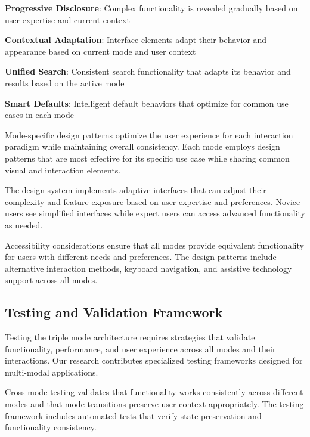 \begin{expandedlist}
    \item \textbf{Progressive Disclosure}: Complex functionality is revealed gradually based on user expertise and current context
    \item \textbf{Contextual Adaptation}: Interface elements adapt their behavior and appearance based on current mode and user context
    \item \textbf{Unified Search}: Consistent search functionality that adapts its behavior and results based on the active mode
    \item \textbf{Smart Defaults}: Intelligent default behaviors that optimize for common use cases in each mode
\end{expandedlist}

Mode-specific design patterns optimize the user experience for each interaction paradigm while maintaining overall consistency. Each mode employs design patterns that are most effective for its specific use case while sharing common visual and interaction elements.

The design system implements adaptive interfaces that can adjust their complexity and feature exposure based on user expertise and preferences. Novice users see simplified interfaces while expert users can access advanced functionality as needed.

Accessibility considerations ensure that all modes provide equivalent functionality for users with different needs and preferences. The design patterns include alternative interaction methods, keyboard navigation, and assistive technology support across all modes.

\subsection*{Testing and Validation Framework}

Testing the triple mode architecture requires strategies that validate functionality, performance, and user experience across all modes and their interactions. Our research contributes specialized testing frameworks designed for multi-modal applications.

Cross-mode testing validates that functionality works consistently across different modes and that mode transitions preserve user context appropriately. The testing framework includes automated tests that verify state preservation and functionality consistency.

